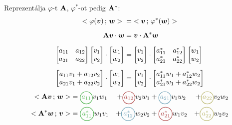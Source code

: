 \documentclass[main.tex]{subfiles}
\begin{document}

Reprezentálja $\varphi$-t $\mathbf{A}$,
$\varphi^{*}$-ot pedig $\mathbf{A}^{*}$:
\begin{align*}
  < \varphi(\boldsymbol{v}) \, ; \, \boldsymbol{w} >
  \; & = \;
  < \boldsymbol{v} \, ; \, \varphi^{*}(\boldsymbol{w}) >
  \\[
  2mm
  ]
  \mathbf{A}\boldsymbol{v} \cdot \boldsymbol{w}
     & =
  \boldsymbol{v} \cdot \mathbf{A}^{*} \boldsymbol{w}
  \\[
  2mm
  ]
  \begin{bmatrix}
    a_{11} & a_{12} \\
    a_{21} & a_{22}
  \end{bmatrix}
  \begin{bmatrix}
    v_1 \\
    v_2
  \end{bmatrix}
  \cdot
  \begin{bmatrix}
    w_1 \\
    w_2
  \end{bmatrix}
     & =
  \begin{bmatrix}
    v_1 \\
    v_2
  \end{bmatrix}
  \cdot
  \begin{bmatrix}
    a_{11}^{*} & a_{12}^{*} \\
    a_{21}^{*} & a_{22}^{*}
  \end{bmatrix}
  \begin{bmatrix}
    w_1 \\
    w_2
  \end{bmatrix}
  \\[
  2mm
  ]
  \begin{bmatrix}
    a_{11} v_1 + a_{12} v_2 \\
    a_{21} v_1 + a_{22} v_2
  \end{bmatrix}
  \cdot
  \begin{bmatrix}
    w_1 \\
    w_2
  \end{bmatrix}
     & =
  \begin{bmatrix}
    v_1 \\
    v_2
  \end{bmatrix}
  \cdot
  \begin{bmatrix}
    a_{11}^{*} w_1 + a_{12}^{*} w_2 \\
    a_{21}^{*} w_1 + a_{22}^{*} w_2
  \end{bmatrix}
\end{align*}
\begin{alignat*}{4}
  \scalar{\rmat{A}\rvec{v}}{\rvec{w}}
   & = \circled{$a_{11}$}{green!40!gray} v_1 w_1
   & + \circled{$a_{12}$}{red!40!gray} v_2 w_1
   & + \circled{$a_{21}$}{cyan!40!gray} v_1 w_2
   & + \circled{$a_{22}$}{yellow!40!gray} v_2 w_2
  \\
  \scalar{\rmat{A}^{*}\rvec{w}}{\rvec{v}}
   & = \circled{$a_{11}^{*}$}{green!40!gray} w_1 v_1
   & + \circled{$a_{12}^{*}$}{cyan!40!gray} w_2 v_2
   & + \circled{$a_{21}^{*}$}{red!40!gray} w_1 v_2
   & + \circled{$a_{22}^{*}$}{yellow!40!gray} w_2 v_2
\end{alignat*}
\end{document}

